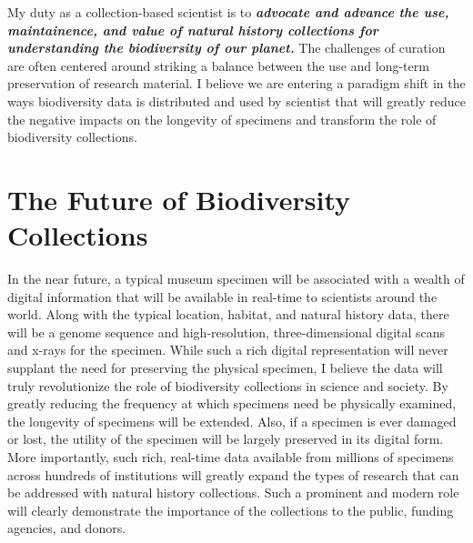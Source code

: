 \documentclass[10pt]{article}
\begin{document}
\raggedright
\singlespacing

My duty as a collection-based scientist is to \textbf{\textit{advocate and
advance the use, maintainence, and value of natural history collections for
understanding the biodiversity of our planet.}}
The challenges of curation are often centered around striking a balance between
the use and long-term preservation of research material.
I believe we are entering a paradigm shift in the ways biodiversity data is
distributed and used by scientist that will greatly reduce the negative impacts
on the longevity of specimens and transform the role of biodiversity
collections.

\section*{The Future of Biodiversity Collections}
In the near future, a typical museum specimen will be associated
with a wealth of digital information that will be available in real-time
to scientists around the world.
Along with the typical location, habitat, and natural history data,
there will be a genome sequence and high-resolution, three-dimensional
digital scans and x-rays for the specimen.
While such a rich digital representation will never supplant the need for
preserving the physical specimen, I believe the data will truly revolutionize
the role of biodiversity collections in science and society.
By greatly reducing the frequency at which specimens need be physically
examined, the longevity of specimens will be extended.
Also, if a specimen is ever damaged or lost, the utility of the specimen will
be largely preserved in its digital form.
More importantly, such rich, real-time data available from millions of
specimens across hundreds of institutions will greatly expand the types of
research that can be addressed with natural history collections.
Such a prominent and modern role will clearly demonstrate the importance
of the collections to the public, funding agencies, and donors.
\end{document}
